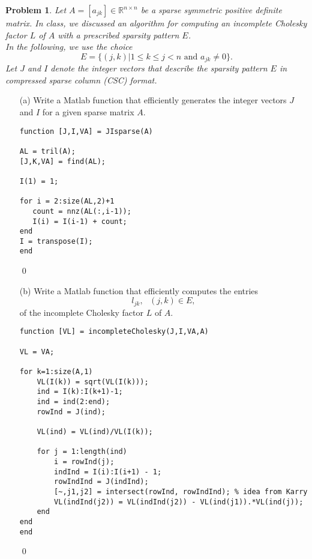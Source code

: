 \documentclass[12pt]{article}
\newtheorem{problem}{Problem}
\def\R{\mathbb{R}}
\begin{document}
\newpage
\bigskip\bigskip
\noindent
\begin{problem} Let $A = [a_{jk}] \in \R^{n\times n}$ be a sparse symmetric positive definite matrix.  In class, we discussed an algorithm for computing an incomplete Cholesky factor $L$ of $A$ with a prescribed sparsity pattern $E$.\\
In the following, we use the choice
$$E = \{ (j,k) | 1 \leq k \leq j <n \text{ and } a_{jk} \neq 0\}.$$
Let $J$ and $I$ denote the integer vectors that describe the sparsity pattern $E$ in compressed sparse column (CSC) format.
\end{problem}

\begin{itemize}
\item[(a)] Write a Matlab function that efficiently generates the integer vectors $J$ and $I$ for a given sparse matrix $A$.\\

\lstset{language=matlab,frame=single}
\begin{lstlisting}[caption= Function to Generate J and I for Sparse Matrix A]
function [J,I,VA] = JIsparse(A)

AL = tril(A);
[J,K,VA] = find(AL);

I(1) = 1;

for i = 2:size(AL,2)+1
   count = nnz(AL(:,i-1));
   I(i) = I(i-1) + count;
end
I = transpose(I);
end
\end{lstlisting}
\qed\\

\item[(b)] Write a Matlab function that efficiently computes the entries
$$l_{jk}, \text{ } (j,k) \in E,$$
of the incomplete Cholesky factor $L$ of $A$.\\

\newpage
\lstset{language=matlab,frame=single}
\begin{lstlisting}[caption= Function to Perform Incomplete Cholesky on Matrix A]
function [VL] = incompleteCholesky(J,I,VA,A)

VL = VA;

for k=1:size(A,1)
    VL(I(k)) = sqrt(VL(I(k)));
    ind = I(k):I(k+1)-1;
    ind = ind(2:end);
    rowInd = J(ind);
    
    VL(ind) = VL(ind)/VL(I(k));
    
    for j = 1:length(ind)
        i = rowInd(j);
        indInd = I(i):I(i+1) - 1;
        rowIndInd = J(indInd);
        [~,j1,j2] = intersect(rowInd, rowIndInd); % idea from Karry
        VL(indInd(j2)) = VL(indInd(j2)) - VL(ind(j1)).*VL(ind(j));
    end
end
end
\end{lstlisting}
\qed\\


\end{itemize}
\end{document}
